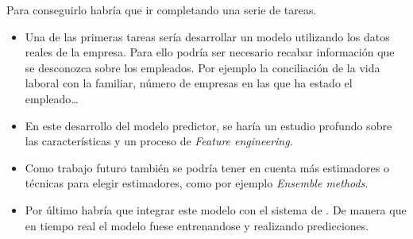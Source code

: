 Para conseguirlo habría que ir completando una serie de tareas.

\begin{itemize}

\item Una de las primeras tareas sería desarrollar un modelo utilizando los datos reales de la empresa. Para ello podría ser necesario recabar información que se desconozca sobre los empleados. Por ejemplo la conciliación de la vida laboral con la familiar, número de empresas en las que ha estado el empleado\ldots\\

\item En este desarrollo del modelo predictor, se haría un estudio profundo sobre las características y un proceso de \textit{Feature engineering}.\\

\item Como trabajo futuro también se podría tener en cuenta más estimadores o técnicas para elegir estimadores, como por ejemplo \textit{Ensemble methods}.\\



\item Por último habría que integrar este modelo con el sistema de \wday{}. De manera que en tiempo real el modelo fuese entrenandose y realizando predicciones.



\end{itemize}


